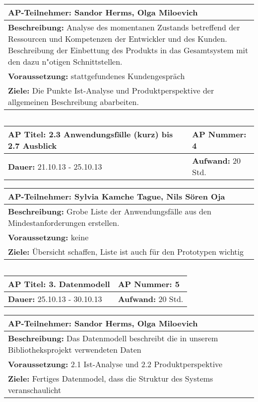 \begin{tabular}{|p{15.3cm}|}
\hline
\textbf{AP-Teilnehmer: }Sandor Herms, Olga Miloevich\\
\hline
\textbf{Beschreibung: }Analyse des momentanen Zustands betreffend der Ressourcen und Kompetenzen der Entwickler und des Kunden.
 Beschreibung der Einbettung des Produkts in das Gesamtsystem mit den dazu n"otigen Schnittstellen.\\
\hline
\textbf{Voraussetzung: }stattgefundenes Kundengespräch\\
\hline 
\textbf{Ziele: }Die Punkte Ist-Analyse und Produktperspektive der allgemeinen Beschreibung abarbeiten.\\
\hline 
\end{tabular}
\begin{verbatim}

\end{verbatim}
\begin{tabular}{|p{7.43cm}|p{7.43cm}|}
\hline
\textbf{AP Titel: }2.3 Anwendungsfälle (kurz) bis 2.7 Ausblick & \textbf{AP Nummer: }4 \\ 
\hline
\textbf{Dauer: }21.10.13 - 25.10.13 & \textbf{Aufwand: }20 Std.\\
\hline
\end{tabular}
\begin{tabular}{|p{15.3cm}|}
\hline
\textbf{AP-Teilnehmer: }Sylvia Kamche Tague, Nils Sören Oja\\
\hline
\textbf{Beschreibung: }Grobe Liste der Anwendungsfälle aus den Mindestanforderungen erstellen.\\
\hline
\textbf{Voraussetzung: }keine\\
\hline 
\textbf{Ziele: }Übersicht schaffen, Liste ist auch für den Prototypen wichtig\\
\hline 
\end{tabular}
\begin{verbatim}

\end{verbatim}
\begin{tabular}{|p{7.43cm}|p{7.43cm}|}
\hline
\textbf{AP Titel: }3. Datenmodell & \textbf{AP Nummer: }5 \\ 
\hline
\textbf{Dauer: }25.10.13 - 30.10.13 & \textbf{Aufwand: }20 Std.\\
\hline
\end{tabular}
\begin{tabular}{|p{15.3cm}|}
\hline
\textbf{AP-Teilnehmer: }Sandor Herms, Olga Miloevich\\
\hline
\textbf{Beschreibung: }Das  Datenmodell beschreibt die in unserem Bibliotheksprojekt verwendeten Daten\\
\hline
\textbf{Voraussetzung: }2.1 Ist-Analyse und 2.2 Produktperspektive\\
\hline 
\textbf{Ziele: }Fertiges Datenmodel, dass die Struktur des Systems veranschaulicht\\
\hline 
\end{tabular}
